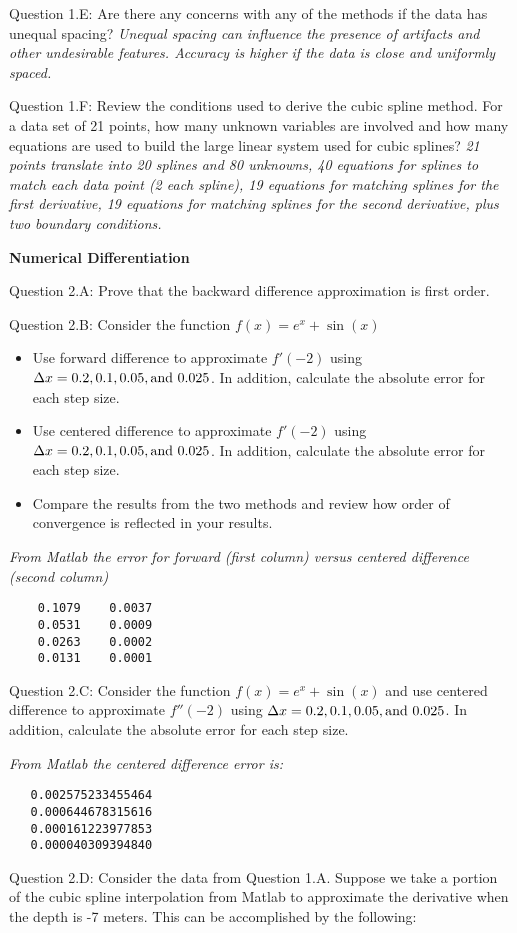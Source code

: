 \documentclass{article}
\def\ds{\displaystyle}
\begin{document}
%
Question 1.E: Are there any concerns with any of the methods if the data has unequal spacing? {\it \color{teal} Unequal spacing can influence the presence of artifacts and other undesirable features. Accuracy is higher if the data is close and uniformly spaced.} 
%
\medskip \par \noindent
Question 1.F: Review the conditions used to derive the cubic spline method. For a data set of 21 points, how many unknown variables are involved and how many equations are used to build the large linear system used for cubic splines? {\it \color{teal} 21 points translate into 20 splines and 80 unknowns, 40 equations for splines to match each data point (2 each spline), 19 equations for matching splines for the first derivative, 19 equations for matching splines for the second derivative, plus two boundary conditions.}
\par \bigskip \par
{\bf Numerical Differentiation } \\

\par \medskip \noindent
%
Question 2.A: Prove that the backward difference approximation is first order. 

 \medskip \par \noindent
%
Question 2.B: Consider the function $\ds f(x) = e^x + \sin(x)$
\begin{itemize}
    \item Use forward difference to approximate $\ds f'(-2)$ using $\ds \Delta x = 0.2, 0.1, 0.05, {\rm and} \ 0.025$. In addition, calculate the absolute error for each step size. 
    \item Use centered difference to approximate $\ds f'(-2)$ using $\ds \Delta x = 0.2, 0.1, 0.05, {\rm and} \ 0.025$. In addition, calculate the absolute error for each step size.
    \item Compare the results from the two methods and review how order of convergence is reflected in your results. 
\end{itemize}
{\it \color{teal} From Matlab the error for forward (first column) versus centered difference (second column)
\begin{verbatim}
    0.1079    0.0037
    0.0531    0.0009    
    0.0263    0.0002    
    0.0131    0.0001    
\end{verbatim}}
 \medskip \par \noindent
%
Question 2.C:   Consider the function $\ds f(x) = e^x + \sin(x)$ and use centered difference to approximate $\ds f''(-2)$ using $\ds \Delta x = 0.2, 0.1, 0.05, {\rm and} \ 0.025$. In addition, calculate the absolute error for each step size. 
{\it \color{teal} From Matlab the centered difference error is:
\begin{verbatim}
   0.002575233455464
   0.000644678315616
   0.000161223977853
   0.000040309394840
\end{verbatim}}
\medskip \par \noindent
%
Question 2.D: Consider the data from Question 1.A. Suppose we take a portion of the cubic spline interpolation from Matlab to approximate the derivative when the depth is -7 meters. This can be accomplished by the following: 
\end{document}
